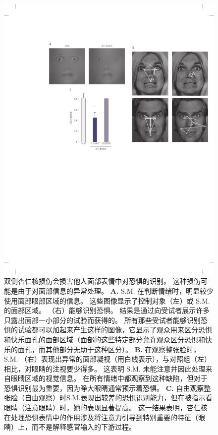 \begin{figure}[htbp]
	\centering
	\includegraphics[width=1.0\linewidth]{chap42/fig_42_7}
	\caption{双侧杏仁核损伤会损害他人面部表情中对恐惧的识别。
		这种损伤可能是由于对面部信息的异常处理。
		\textbf{A.} S.M. 在判断情绪时，明显较少使用面部眼部区域的信息。
		这些图像显示了控制对象（左）或 S.M. 的面部区域。
		（右）能够识别恐惧。
		结果是通过向受试者展示许多只露出面部一小部分的试验而获得的。
		所有那些受试者能够识别恐惧的试验都可以加起来产生这样的图像，它显示了观众用来区分恐惧和快乐面孔的面部区域（面部的这些特定部分允许观众区分恐惧和快乐的面孔，而其他部分无助于这种区分）。
		\textbf{B.} 在观察整张脸时，S.M. （右）表现出异常的面部凝视（用白线表示），与对照组（左）相比，对眼睛的注视要少得多。
		这表明 S.M. 未能注意并因此处理来自眼睛区域的视觉信息。
		在所有情绪中都观察到这种缺陷，但对于恐惧识别最为重要，因为睁大眼睛通常预示着恐惧。
		\textbf{C.} 自由观察整张脸（自由观察）时S.M.表现出较差的恐惧识别能力，但在被指示看眼睛（注意眼睛）时，她的表现显著提高。
		这一结果表明，杏仁核在处理恐惧表情中的作用涉及将注意力引导到特别重要的特征（眼睛）上，而不是解释感官输入的下游过程。}
	\label{fig:42_7}
\end{figure}


